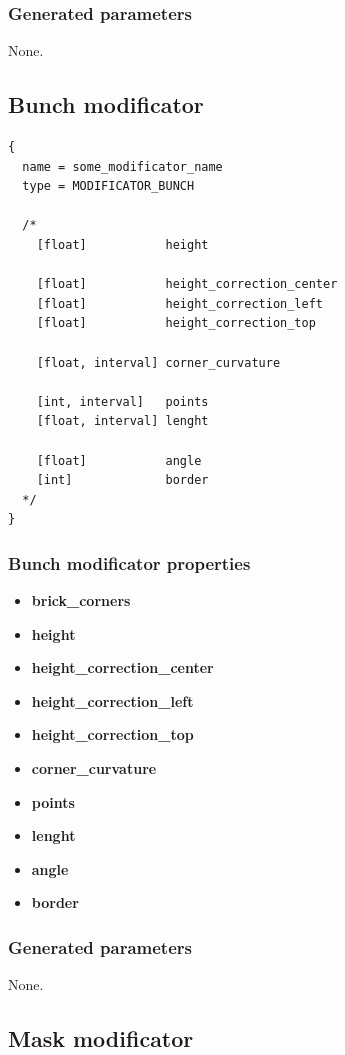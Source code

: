 \documentclass[9pt]{article}
\begin{document}
\subsubsection*{Generated parameters}

None.

\subsection{Bunch modificator}

\begin{verbatim}
{
  name = some_modificator_name
  type = MODIFICATOR_BUNCH

  /*
    [float]           height
    
    [float]           height_correction_center
    [float]           height_correction_left
    [float]           height_correction_top      
    
    [float, interval] corner_curvature
    
    [int, interval]   points
    [float, interval] lenght
    
    [float]           angle
    [int]             border
  */
}
\end{verbatim}
\subsubsection*{Bunch modificator properties}
\begin{itemize}
\item{\bf brick\_corners}
\item{\bf height}
\item{\bf height\_correction\_center}
\item{\bf height\_correction\_left}
\item{\bf height\_correction\_top}
\item{\bf corner\_curvature}
\item{\bf points}
\item{\bf lenght}
\item{\bf angle}
\item{\bf border}
\end{itemize}

\subsubsection*{Generated parameters}

None.

\subsection{Mask modificator}
\end{document}
